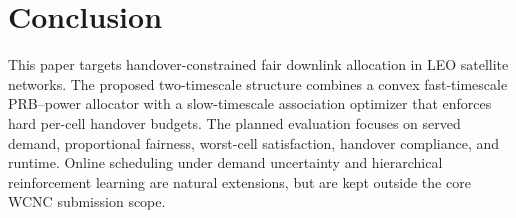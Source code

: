 
\section{Conclusion}

This paper targets handover-constrained fair downlink allocation in LEO
satellite networks. The proposed two-timescale structure combines a convex
fast-timescale PRB--power allocator with a slow-timescale association optimizer
that enforces hard per-cell handover budgets. The planned evaluation focuses on
served demand, proportional fairness, worst-cell satisfaction, handover
compliance, and runtime. Online scheduling under demand uncertainty and
hierarchical reinforcement learning are natural extensions, but are kept outside
the core WCNC submission scope.
